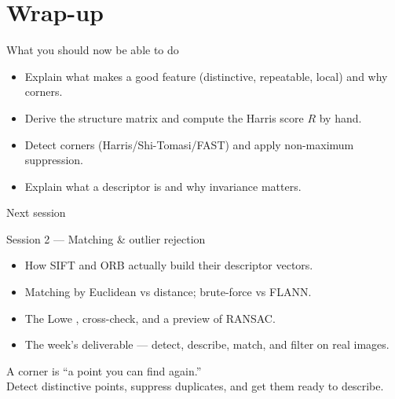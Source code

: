 \documentclass[10pt,aspectratio=169]{beamer}
\begin{document}
\section{Wrap-up}

\begin{frame}{What you should now be able to do}
  \begin{itemize}
    \item Explain what makes a good feature (distinctive, repeatable, local) and why corners.
    \item Derive the structure matrix and compute the Harris score $R$ by hand.
    \item Detect corners (Harris/Shi-Tomasi/FAST) and apply non-maximum suppression.
    \item Explain what a descriptor is and why invariance matters.
  \end{itemize}
\end{frame}

\begin{frame}{Next session}
  \begin{alertblock}{Session 2 — Matching \& outlier rejection}
    \begin{itemize}
      \item How SIFT and ORB actually build their descriptor vectors.
      \item Matching by Euclidean vs  distance; brute-force vs FLANN.
      \item The Lowe , cross-check, and a preview of RANSAC.
      \item The week's deliverable — detect, describe, match, and filter on real images.
    \end{itemize}
  \end{alertblock}
\end{frame}

\begin{frame}[standout]
  A corner is ``a point you can find again.''\\[4pt]
  \normalsize Detect distinctive points, suppress duplicates, and get them ready to describe.
\end{frame}
\end{document}
